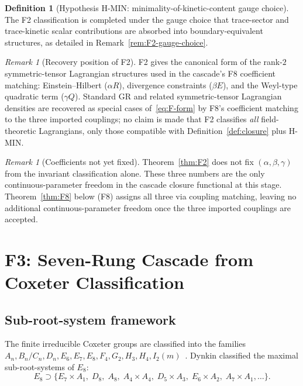 \documentclass[12pt]{article}
\theoremstyle{definition}
\newtheorem{definition}[theorem]{Definition}
\theoremstyle{remark}
\newtheorem{remark}[theorem]{Remark}
\begin{document}
\begin{definition}[Hypothesis H-MIN: minimality-of-kinetic-content gauge choice]\label{hyp:MIN}
The F2 classification is completed under the gauge choice that trace-sector and trace-kinetic scalar contributions are absorbed into boundary-equivalent structures, as detailed in Remark~\ref{rem:F2-gauge-choice}.
\end{definition}

\begin{remark}[Recovery position of F2]
F2 gives the canonical form of the rank-$2$ symmetric-tensor Lagrangian structures used in the cascade's F8 coefficient matching: Einstein--Hilbert ($\alpha R$), divergence constraints ($\beta E$), and the Weyl-type quadratic term ($\gamma Q$). Standard GR and related symmetric-tensor Lagrangian densities are recovered as special cases of~\eqref{eq:F-form} by F8's coefficient matching to the three imported couplings; no claim is made that F2 classifies \emph{all} field-theoretic Lagrangians, only those compatible with Definition~\ref{def:closure} plus H-MIN.
\end{remark}

\begin{remark}[Coefficients not yet fixed]\label{rem:F2-coeffs}
Theorem~\ref{thm:F2} does not fix $(\alpha, \beta, \gamma)$ from the invariant classification alone. These three numbers are the only continuous-parameter freedom in the cascade closure functional at this stage. Theorem~\ref{thm:F8} below (F8) assigns all three via coupling matching, leaving no additional continuous-parameter freedom once the three imported couplings are accepted.
\end{remark}

\section{F3: Seven-Rung Cascade from Coxeter Classification}\label{sec:F3}

\subsection{Sub-root-system framework}

The finite irreducible Coxeter groups are classified into the families $A_n, B_n/C_n, D_n, E_6, E_7, E_8, F_4, G_2, H_3, H_4, I_2(m)$~\citep{Coxeter1973,Bourbaki2002}. Dynkin classified the maximal sub-root-systems of $E_8$:
\begin{equation}
E_8 \supset \{E_7 \times A_1,\; D_8,\; A_8,\; A_4 \times A_4,\; D_5 \times A_3,\; E_6 \times A_2,\; A_7 \times A_1, \ldots\}.
\end{equation}
\end{document}
